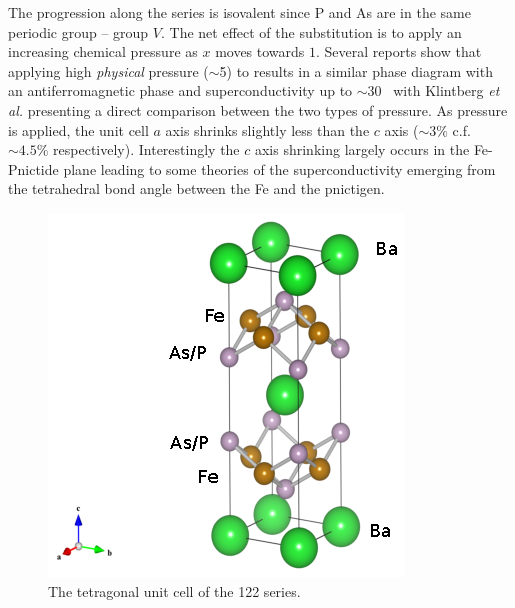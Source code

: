  The progression along the series is isovalent since P and As are in the same periodic group -- group $V$. The net effect of the substitution is to apply an increasing chemical pressure as $x$ moves towards $1$. Several reports show that applying high \textit{physical} pressure ($\sim$\unit{5}{\giga\pascal}) to \BaFeAs results in a similar phase diagram with an antiferromagnetic phase and superconductivity up to $\sim$\unit{30}{\kelvin}~\cite{Yamazaki2010,Colombier2009,Alireza2009} with Klintberg \textit{et al.}\cite{Klintberg2010} presenting a direct comparison between the two types of pressure. As pressure is applied, the unit cell $a$ axis shrinks slightly less than the $c$ axis ($\sim3\%$ c.f. $\sim4.5\%$ respectively). Interestingly the $c$ axis shrinking largely occurs in the Fe-Pnictide plane leading to some theories of the superconductivity emerging from the tetrahedral bond angle between the Fe and the pnictigen. 
\begin{figure}[htbp]
    \begin{center}
        \includegraphics[scale=1.0]{Chapter-Introduction/Figures/UnitCell/UnitCell}
        \caption{The tetragonal unit cell of the 122 \BaFePAs series.}
        \label{Fig:Intro:UnitCell}
    \end{center}
\end{figure}


